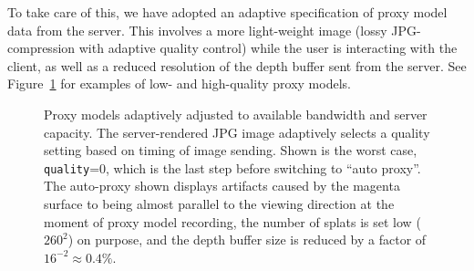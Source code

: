 To take care of this, we have adopted an adaptive specification of
proxy model data from the server. This involves a more light-weight image (lossy
JPG-compression with adaptive quality control) while the user is interacting
with the client, as well as a reduced resolution of the depth buffer sent from
the server. See Figure~\ref{fig:adapativeProxyModels} for examples of low- and
high-quality proxy models.

\begin{figure}[htb]
  \centering
  \caption{\label{fig:adapativeProxyModels}
           Proxy models adaptively adjusted to available bandwidth and server
           capacity. The server-rendered JPG image adaptively selects a quality
  setting based on timing of image sending. Shown is the worst
  case, \texttt{quality}=0, which is the last step before switching to ``auto
  proxy''. The auto-proxy shown displays artifacts caused by the magenta surface
  to being almost parallel to the viewing direction at the moment of proxy model
  recording, the number of splats is set low ($260^2$) on purpose, and the depth
  buffer size is reduced by a factor of $16^{-2} \approx 0.4\%$.}
\end{figure}



